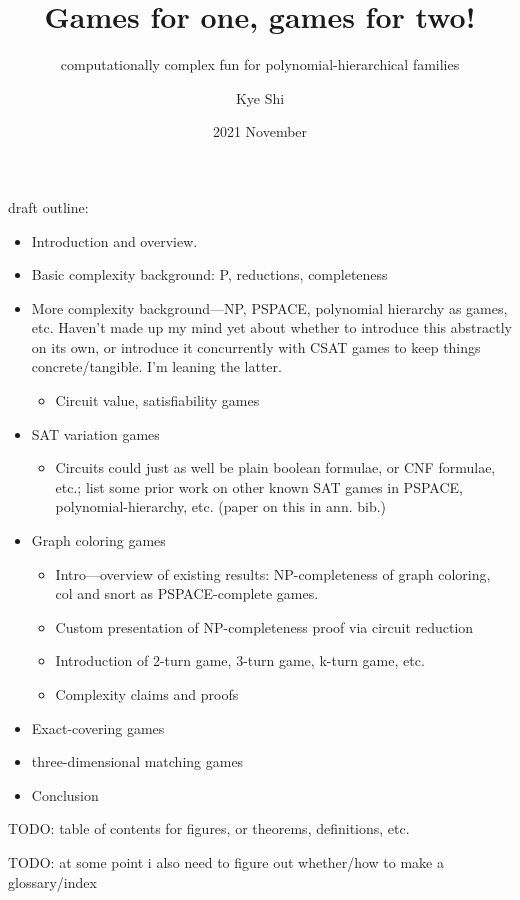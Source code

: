 \documentclass{final-report}
\title{Games for one, games for two!}
\subtitle{computationally complex fun for polynomial-hierarchical families}
\author{Kye Shi}
\date{2021 November}
\begin{document}
\frontmatter
\maketitle
\tableofcontents

draft outline:

\begin{itemize}
  \item Introduction and overview.
  \item Basic complexity background: P, reductions, completeness
  \item More complexity background---NP, PSPACE, polynomial hierarchy as games,
    etc. Haven't made up my mind yet about whether to introduce this abstractly
    on its own, or introduce it concurrently with CSAT games to keep things
    concrete/tangible.  I'm leaning the latter.
    \begin{itemize}
      \item Circuit value, satisfiability games
    \end{itemize}
  \item SAT variation games
    \begin{itemize}
      \item Circuits could just as well be plain boolean formulae, or CNF
        formulae, etc.; list some prior work on other known SAT games in
        PSPACE, polynomial-hierarchy, etc.  (paper on this in ann. bib.)
    \end{itemize}
  \item Graph coloring games
    \begin{itemize}
      \item Intro---overview of existing results: NP-completeness of graph
        coloring, col and snort as PSPACE-complete games.
      \item Custom presentation of NP-completeness proof via circuit reduction
      \item Introduction of 2-turn game, 3-turn game, k-turn game, etc.
      \item Complexity claims and proofs
    \end{itemize}
  \item Exact-covering games
  \item three-dimensional matching games
  \item Conclusion %
\end{itemize}

TODO: table of contents for figures, or theorems, definitions, etc.

TODO: at some point i also need to figure out whether/how to make a glossary/index


\mainmatter








%
%
%
%

\printbibliography[heading=bibnumbered]
\end{document}
